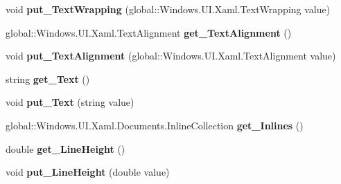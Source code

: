 \begin{DoxyCompactItemize}
void {\bfseries put\+\_\+\+Text\+Wrapping} (global\+::\+Windows.\+U\+I.\+Xaml.\+Text\+Wrapping value)
\item 
\mbox{\label{interface_windows_1_1_u_i_1_1_xaml_1_1_controls_1_1_i_text_block_a830e1b11e0ae1ce7d5dfcacbb0034c62}} 
global\+::\+Windows.\+U\+I.\+Xaml.\+Text\+Alignment {\bfseries get\+\_\+\+Text\+Alignment} ()
\item 
\mbox{\label{interface_windows_1_1_u_i_1_1_xaml_1_1_controls_1_1_i_text_block_aec1946ac3a3d6391c36750affe93432d}} 
void {\bfseries put\+\_\+\+Text\+Alignment} (global\+::\+Windows.\+U\+I.\+Xaml.\+Text\+Alignment value)
\item 
\mbox{\label{interface_windows_1_1_u_i_1_1_xaml_1_1_controls_1_1_i_text_block_a582d57058231ec6b50d2a938c3a978bc}} 
string {\bfseries get\+\_\+\+Text} ()
\item 
\mbox{\label{interface_windows_1_1_u_i_1_1_xaml_1_1_controls_1_1_i_text_block_a533b263e3487949e055f809bb25ece2f}} 
void {\bfseries put\+\_\+\+Text} (string value)
\item 
\mbox{\label{interface_windows_1_1_u_i_1_1_xaml_1_1_controls_1_1_i_text_block_a7234cc32a3da58efce8a882b5d2f996e}} 
global\+::\+Windows.\+U\+I.\+Xaml.\+Documents.\+Inline\+Collection {\bfseries get\+\_\+\+Inlines} ()
\item 
\mbox{\label{interface_windows_1_1_u_i_1_1_xaml_1_1_controls_1_1_i_text_block_a29846e44fd22f40af0b4b7d83f9e298d}} 
double {\bfseries get\+\_\+\+Line\+Height} ()
\item 
\mbox{\label{interface_windows_1_1_u_i_1_1_xaml_1_1_controls_1_1_i_text_block_a303a08f111a62df9e5b76472112e914c}} 
void {\bfseries put\+\_\+\+Line\+Height} (double value)
\item 
\mbox{\label{interface_windows_1_1_u_i_1_1_xaml_1_1_controls_1_1_i_text_block_af727476045815cf9cc9cf515d6d80a24}} 

\end{DoxyCompactItemize}
